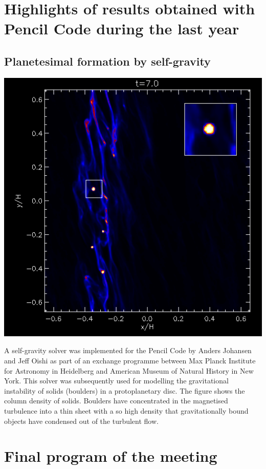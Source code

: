 \documentclass{article}
\begin{document}
\section{Highlights of results obtained with Pencil Code during the last year}

\subsection{Planetesimal formation by self-gravity}

\begin{center}
  \includegraphics[width=0.5\linewidth]{planetesimal.png}\\
\end{center}
A self-gravity solver was implemented for the Pencil Code by Anders Johansen
and Jeff Oishi as part of an exchange programme between Max Planck Institute for
Astronomy in Heidelberg and American Museum of Natural History in New York.
This solver was subsequently used for modelling the gravitational instability
of solids (boulders) in a protoplanetary disc. The figure shows the column
density of solids. Boulders have concentrated in the magnetised turbulence into
a thin sheet with a so high density that gravitationally bound objects have
condensed out of the turbulent flow.

\section{Final program of the meeting}
\end{document}
